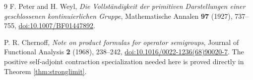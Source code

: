 \documentclass[11pt]{article}
\begin{document}
\begin{thebibliography}{9}
F. Peter and H. Weyl, \emph{Die Vollst\"andigkeit der primitiven
Darstellungen einer geschlossenen kontinuierlichen Gruppe},
Mathematische Annalen \textbf{97} (1927), 737--755,
\href{https://doi.org/10.1007/BF01447892}{doi:10.1007/BF01447892}.

P. R. Chernoff, \emph{Note on product formulas for operator semigroups},
Journal of Functional Analysis \textbf{2} (1968), 238--242,
\href{https://doi.org/10.1016/0022-1236(68)90020-7}
{doi:10.1016/0022-1236(68)90020-7}.
The positive self-adjoint contraction specialization needed here is
proved directly in Theorem \ref{thm:stronglimit}.
\end{thebibliography}
\end{document}
